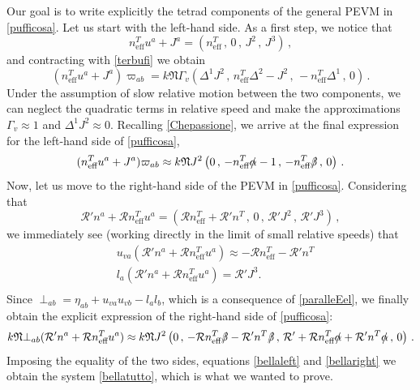 \documentclass[preprints,article,accept,moreauthors,pdftex]{mdpi}
\begin{document}
Our goal is to write explicitly the tetrad components of the general PEVM in \eqref{pufficosa}. 
Let us start with the left-hand side. As a first step, we notice that
\begin{equation}
n^T_{\text{eff}} u^a +J^a = (n^T_{\text{eff}} \, , \, 0 \, , \, J^2 \, , \, J^3) \, ,
\end{equation}
and contracting with \eqref{terbufi} we  obtain 
\begin{equation}
(n^T_{\text{eff}} u^a +J^a)\varpi_{ab} = k \mathfrak{N} \Gamma_v 
\left( 
     \Delta^1 J^2 \, , \, 
 n^T_{\text{eff}} \Delta^2 -J^2   \, , \, 
 - n^T_{\text{eff}} \Delta^1 \, , \, 
  0   \right) \, .
\end{equation}
Under the assumption of slow relative motion between the two components, we can neglect the quadratic terms in relative speed and make the approximations $\Gamma_v \approx 1$ and $\Delta^1 J^2 \approx 0$. Recalling \eqref{Chepassione}, we arrive at the final expression for the left-hand side of \eqref{pufficosa},
\begin{equation}\label{bellaleft}
(n^T_{\text{eff}} u^a +J^a)\varpi_{ab} \approx  k \mathfrak{N}  J^2
\left( 
    0 \, , \,
  -n^T_{\text{eff}} \slashed{\alpha} -1  \, , \,
  -n^T_{\text{eff}} \slashed{\beta} \, , \,
   0
  \right) \, .
\end{equation}
Now, let us move to the right-hand side of the PEVM in \eqref{pufficosa}. Considering that
\begin{equation}
\mathcal{R}' n^a + \mathcal{R} n^T_{\text{eff}} u^a = (\mathcal{R} n^T_{\text{eff}}+\mathcal{R}'n^T \, , \,0 \, , \,\mathcal{R}' J^2 \, , \,\mathcal{R}' J^3)  \, , 
\end{equation}
we immediately see (working directly in the limit of small relative speeds) that
\begin{equation}
\begin{split}
& u_{va}(\mathcal{R}' n^a + \mathcal{R} n^T_{\text{eff}} u^a)\approx -\mathcal{R} n^T_{\text{eff}}-\mathcal{R}'n^T \\
& l_a(\mathcal{R}' n^a + \mathcal{R} n^T_{\text{eff}} u^a)= \mathcal{R}' J^3. \\
\end{split}
\end{equation}
Since
$ {\perp}_{ab} = \eta_{ab} + u_{va} u_{vb} - l_a l_b  $, which is a consequence of  \eqref{paralleEel}, we finally obtain the explicit expression of the right-hand side of \eqref{pufficosa}:
\begin{equation}\label{bellaright}
k \mathfrak{N} {\perp}_{ab}(\mathcal{R}' n^a + \mathcal{R} n^T_{\text{eff}} u^a) \approx k \mathfrak{N} J^2  
\left( 
     0 \, , \,
-\mathcal{R}  n^T_{\text{eff}} \slashed{\beta} - \mathcal{R}' n^T \slashed{\beta}  \, , \,
 \mathcal{R}' + \mathcal{R}  n^T_{\text{eff}} \slashed{\alpha} + \mathcal{R}' n^T \slashed{\alpha}  \, , \,
  0 
  \right)\, .
\end{equation}
Imposing the equality of the two sides, equations \eqref{bellaleft} and \eqref{bellaright} we obtain the system \eqref{bellatutto}, which is what we wanted to prove.
\end{document}
